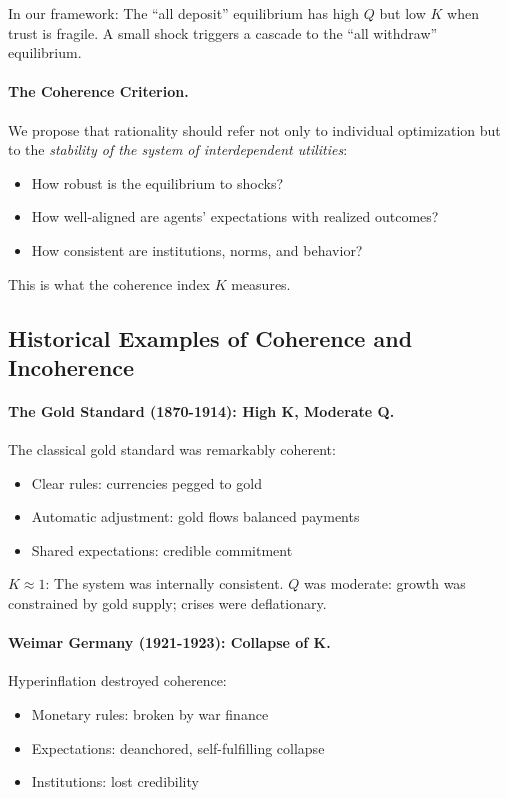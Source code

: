 In our framework: The ``all deposit'' equilibrium has high $Q$ but low $K$
when trust is fragile. A small shock triggers a cascade to the ``all withdraw'' equilibrium.

\paragraph{The Coherence Criterion.}
We propose that rationality should refer not only to individual optimization
but to the \emph{stability of the system of interdependent utilities}:
\begin{itemize}
  \item How robust is the equilibrium to shocks?
  \item How well-aligned are agents' expectations with realized outcomes?
  \item How consistent are institutions, norms, and behavior?
\end{itemize}

This is what the coherence index $K$ measures.

\subsection{Historical Examples of Coherence and Incoherence}

\paragraph{The Gold Standard (1870-1914): High K, Moderate Q.}
The classical gold standard was remarkably coherent:
\begin{itemize}
  \item Clear rules: currencies pegged to gold
  \item Automatic adjustment: gold flows balanced payments
  \item Shared expectations: credible commitment
\end{itemize}

$K \approx 1$: The system was internally consistent.
$Q$ was moderate: growth was constrained by gold supply; crises were deflationary.

\paragraph{Weimar Germany (1921-1923): Collapse of K.}
Hyperinflation destroyed coherence:
\begin{itemize}
  \item Monetary rules: broken by war finance
  \item Expectations: deanchored, self-fulfilling collapse
  \item Institutions: lost credibility
\end{itemize}

